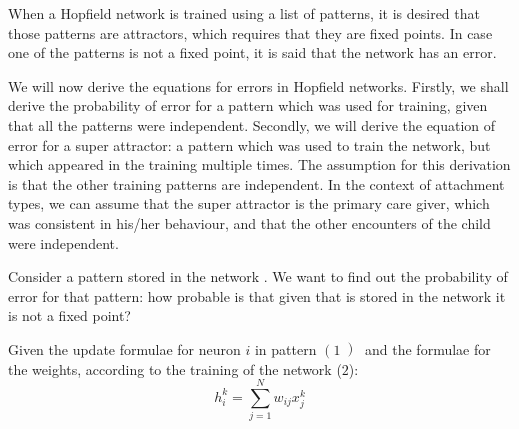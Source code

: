 
\newcommand{\mathpi}{\pi}
\newcommand{\nin}{\not\in}
\newcommand{\nosymbol}{}
\newcommand{\tmem}[1]{{\em #1\/}}
\newcommand{\tmkbd}[1]{\texttt{#1}}
\newcommand{\tmfloatcontents}{}
\newlength{\tmfloatwidth}
\newcommand{\tmfloat}[5]{
  \renewcommand{\tmfloatcontents}{#4}
  \setlength{\tmfloatwidth}{\widthof{\tmfloatcontents}+1in}
  \ifthenelse{\equal{#2}{small}}
    {\ifthenelse{\lengthtest{\tmfloatwidth > \linewidth}}
      {\setlength{\tmfloatwidth}{\linewidth}}{}}
    {\setlength{\tmfloatwidth}{\linewidth}}
  \begin{minipage}[#1]{\tmfloatwidth}
    \begin{center}
      \tmfloatcontents
      \captionof{#3}{#5}
    \end{center}
  \end{minipage}}



When a Hopfield network is trained using a list of patterns, it is desired
that those patterns are attractors, which requires that they are fixed points.
In case one of the patterns is not a fixed point, it is said that the network
has an error.

We will now derive the equations for errors in Hopfield networks.
Firstly, we shall derive the probability of error for a pattern which was used
for training, given that all the patterns were independent. Secondly, we will
derive the equation of error for a super attractor: a pattern which was used
to train the network, but which appeared in the training multiple times. The
assumption for this derivation is that the other training patterns are
independent. In the context of attachment types, we can assume that the super
attractor is the primary care giver, which was consistent in his/her
behaviour, and that the other encounters of the child were independent.


Consider a pattern stored in the network . We want to find out
the probability of error for that pattern: how probable is that given that
 is stored in the network it is not a fixed point?

Given the update formulae for neuron $i$ in pattern  $\left( 1
\left) \right. \right.$ and the formulae for the weights, according to the
training of the network ($2$):
\[ h_i^k = \sum^N_{j = 1} w_{i j} x_j^k  \]

